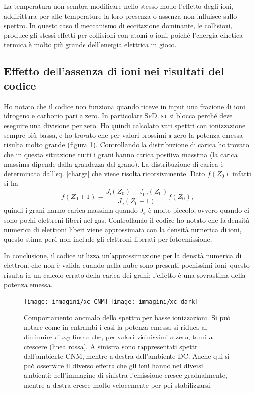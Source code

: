 La temperatura non sembra modificare nello stesso modo l'effetto degli ioni, addirittura per alte temperature la loro presenza o assenza non influisce sullo spettro. In questo caso il meccanismo di eccitazione dominante, le collisioni, produce gli stessi effetti per collisioni con atomi o ioni, poiché l'energia cinetica termica è molto più grande dell'energia elettrica in gioco. 

\newpage
\subsection{Effetto dell'assenza di ioni nei risultati del codice}
\label{app}
Ho notato che il codice non funziona quando riceve in input una frazione di ioni idrogeno e carbonio pari a zero.
In particolare \textsc{SpDust} si blocca perché deve eseguire una divisione per zero. Ho quindi calcolato vari spettri con ionizzazione sempre più bassa, e ho trovato che per valori prossimi a zero la potenza emessa risulta molto grande (figura \ref{errore}). Controllando la distribuzione di carica ho trovato che in questa situazione tutti i grani hanno carica positiva massima (la carica massima dipende dalla grandezza del grano). La distribuzione di carica è determinata dall'eq. \ref{charge} che viene risolta ricorsivamente. Dato $f(Z_0)$ infatti si ha
\begin{equation}
f(Z_0+1) = \frac{J_\mathrm{i}(Z_0)+J_\mathrm{pe}(Z_0)}{J_\mathrm{e}(Z_0+1)}f(Z_0),
\end{equation}
quindi i grani hanno carica massima quando $J_\mathrm{e}$ è molto piccolo, ovvero quando ci sono pochi elettroni liberi nel gas. Controllando il codice ho notato che la densità numerica di elettroni liberi viene approssimata con la densità numerica di ioni, questo stima però non include gli elettroni liberati per fotoemissione.

In conclusione, il codice utilizza un'approssimazione per la densità numerica di elettroni che non è valida quando nella nube sono presenti pochissimi ioni, questo risulta in un calcolo errato della carica dei grani; l'effetto è una sovrastima della potenza emessa.
\begin{figure}
	
	\centerline{
		\centering
		\subfigure
		{\texttt{[image: immagini/xc\_CNM]}}
		\hspace{-5mm}
		\subfigure
		{\texttt{[image: immagini/xc\_dark]}}
	}
	\caption{Comportamento anomalo dello spettro per basse ionizzazioni. Si può notare come in entrambi i casi la potenza emessa si riduca al diminuire di $x_\mathrm{C}$ fino a che, per valori vicinissimi a zero, torni a crescere (linea rossa). A sinistra sono rappresentati spettri dell'ambiente CNM, mentre a destra dell'ambiente DC. Anche qui si può osservare il diverso effetto che gli ioni hanno nei diversi ambienti: nell'immagine di sinistra l'emissione cresce gradualmente, mentre a destra cresce molto velocemente per poi stabilizzarsi.}
	\label{errore}
\end{figure}